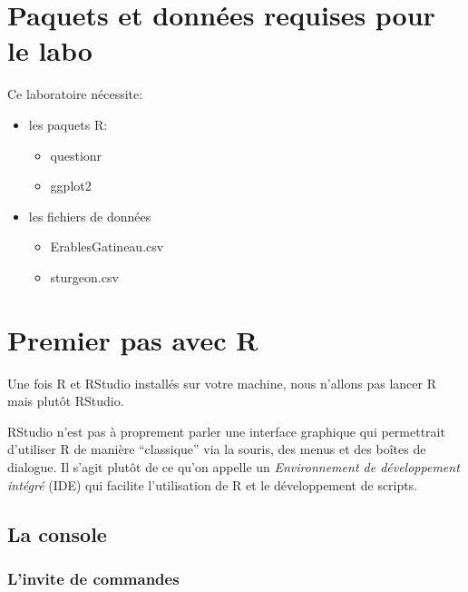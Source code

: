 \documentclass[12pt,]{book}
\providecommand{\tightlist}{%
  \setlength{\itemsep}{0pt}\setlength{\parskip}{0pt}}
\begin{document}
\hypertarget{set-intro}{%
\section{Paquets et données requises pour le labo}\label{set-intro}}

Ce laboratoire nécessite:

\begin{itemize}
\tightlist
\item
  les paquets R:

  \begin{itemize}
  \tightlist
  \item
    questionr
  \item
    ggplot2
  \end{itemize}
\item
  les fichiers de données

  \begin{itemize}
  \tightlist
  \item
    ErablesGatineau.csv
  \item
    sturgeon.csv
  \end{itemize}
\end{itemize}

\hypertarget{premier-pas-avec-r}{%
\section{Premier pas avec R}\label{premier-pas-avec-r}}

Une fois R et RStudio installés sur votre machine, nous n'allons pas lancer R mais plutôt RStudio.

RStudio n'est pas à proprement parler une interface graphique qui permettrait d'utiliser R de manière ``classique'' via la souris, des menus et des boîtes de dialogue. Il s'agit plutôt de ce qu'on appelle un \emph{Environnement de développement intégré} (IDE) qui facilite l'utilisation de R et le développement de scripts.

\hypertarget{la-console}{%
\subsection{La console}\label{la-console}}

\hypertarget{linvite-de-commandes}{%
\subsubsection{L'invite de commandes}\label{linvite-de-commandes}}
\end{document}
